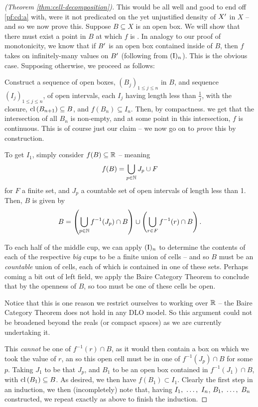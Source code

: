 \begin{proof}[\CD (Theorem \ref{thm:cell-decomposition})]
  This would be all well and good to end off \ref{pf:cd:a} with, were it not predicated on the yet unjustified density of $\Xprime$ in $X$ -- and so we now prove this. Suppose $B \subseteq X$ is an open box. We will show that there must exist a point in $B$ at which $f$ is \cont. In analogy to our proof of monotonicity, we know that if $\Xprime[B]$ is an open box contained inside of $B$, then $f$ takes on infinitely-many values on $\Xprime[B]$ (following from $\In$). This is the obvious case. Supposing otherwise, we proceed as follows:

  Construct a sequence of open boxes, $(B_j)_{1 \leq j \leq n}$ in $B$, and sequence $(I_j)_{1 \leq j \leq n}$, of open intervals, each $I_j$ having length less than $\frac{1}{j}$, with the closure, $\cl{B_{n+1}} \subseteq B$, and $f(B_n) \subseteq I_n$. Then, by compactness. we get that the intersection of all $B_n$ is non-empty, and at some point in this intersection, $f$ is continuous. This is of course just our claim -- we now go on to \emph{prove} this by construction.

  To get $I_1$, simply consider $f(B) \subseteq \R$ -- meaning
  \begin{align*}
    f(B) = \bigcup_{p \in \N} J_p \cup F
  \end{align*}
  for $F$ a finite set, and $J_p$ a countable set of open intervals of length less than 1. Then, $B$ is given by
  \begin{align*}
    B = \left( \bigcup_{p \in \N} f^{-1}(J_p) \cap B \right) \cup \left( \bigcup_{r \in F} f^{-1}(r) \cap B \right).
  \end{align*}

  To each half of the middle cup, we can apply $\In$ to determine the contents of each of the respective \emph{big} cups to be a finite union of cells -- and so $B$ must be an \emph{countable} union of cells, each of which is contained in one of these sets. Perhaps coming a bit out of left field, we apply the Baire Category Theorem to conclude that by the openness of $B$, so too must be one of these cells be open.
  \begin{svgraybox}
    Notice that this is one reason we restrict ourselves to working over $\R$ -- the Baire Category Theorem does not hold in any DLO model. So this argument could not be broadened beyond the reals (or compact spaces) as we are currently undertaking it.
  \end{svgraybox}
  This \emph{cannot} be one of $f^{-1}(r) \cap B$, as it would then contain a box on which we took the value of $r$, an so this open cell must be in one of $f^{-1}(J_p) \cap B$ for some $p$. Taking $J_1$ to be that $J_p$, and $B_1$ to be an open box contained in $f^{-1}(J_1) \cap B$, with $\cl{B_1} \subseteq B$. As desired, we then have $f(B_1) \subset I_1$. Clearly the first step in an induction, we then (incompletely) note that, having $\vonevm{I}{n}$, $\vonevm{B}{n}$ constructed, we repeat exactly as above to finish the induction.


\end{proof}
